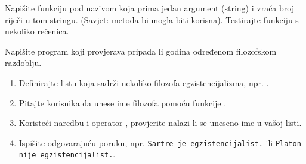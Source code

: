 \begin{vježba}
    Napišite funkciju pod nazivom  koja prima jedan argument (string) i vraća broj riječi u tom stringu. (Savjet: metoda  bi mogla biti korisna). Testirajte funkciju s nekoliko rečenica.
\end{vježba}

\begin{vježba}
    Napišite program koji provjerava pripada li godina određenom filozofskom razdoblju.
    \begin{enumerate}
        \item Definirajte listu koja sadrži nekoliko filozofa egzistencijalizma, npr. .
        \item Pitajte korisnika da unese ime filozofa pomoću funkcije .
        \item Koristeći  naredbu i operator , provjerite nalazi li se uneseno ime u vašoj listi.
        \item Ispišite odgovarajuću poruku, npr. \texttt{Sartre je egzistencijalist.} ili \texttt{Platon nije egzistencijalist.}.
    \end{enumerate}
\end{vježba}